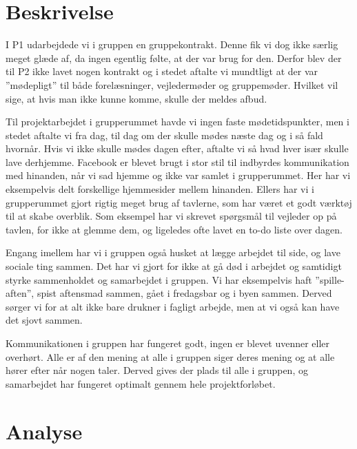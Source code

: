 \section{Beskrivelse}
I P1 udarbejdede vi i gruppen en gruppekontrakt. Denne fik vi dog ikke særlig meget glæde af, da ingen egentlig følte, at der var brug for den. Derfor blev der til P2 ikke lavet nogen kontrakt og i stedet aftalte vi mundtligt at der var ”mødepligt” til både forelæsninger, vejledermøder og gruppemøder. Hvilket vil sige, at hvis man ikke kunne komme, skulle der meldes afbud.

Til projektarbejdet i grupperummet havde vi ingen faste mødetidspunkter, men i stedet aftalte vi fra dag, til dag om der skulle mødes næste dag og i så fald hvornår. Hvis vi ikke skulle mødes dagen efter, aftalte vi så hvad hver især skulle lave derhjemme.
Facebook er blevet brugt i stor stil til indbyrdes kommunikation med hinanden, når vi sad hjemme og ikke var samlet i grupperummet. Her har vi eksempelvis delt forskellige hjemmesider mellem hinanden. 
Ellers har vi i grupperummet gjort rigtig meget brug af tavlerne, som har været et godt værktøj til at skabe overblik. Som eksempel har vi skrevet spørgsmål til vejleder op på tavlen, for ikke at glemme dem, og ligeledes ofte lavet en to-do liste over dagen. 

Engang imellem har vi i gruppen også husket at lægge arbejdet til side, og lave sociale ting sammen. Det har vi gjort for ikke at gå død i arbejdet og samtidigt styrke sammenholdet og samarbejdet i gruppen. Vi har eksempelvis haft ”spille-aften”, spist aftensmad sammen, gået i fredagsbar og i byen sammen. Derved sørger vi for at alt ikke bare drukner i fagligt arbejde, men at vi også kan have det sjovt sammen.

Kommunikationen i gruppen har fungeret godt, ingen er blevet uvenner eller overhørt. Alle er af den mening at alle i gruppen siger deres mening og at alle hører efter når nogen taler. Derved gives der plads til alle i gruppen, og  samarbejdet har fungeret optimalt gennem hele projektforløbet.

\section{Analyse}

